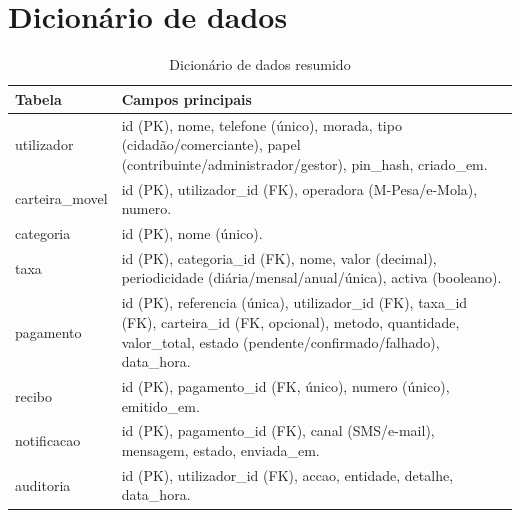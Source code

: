 \documentclass[12pt,a4paper,openany]{report}
\begin{document}
\chapter{Dicionário de dados}
\begin{table}[!htbp]
\caption{Dicionário de dados resumido}\label{tab:dd}
\begingroup\singlespacing\small
\begin{tabularx}{\textwidth}{@{}>{\ttfamily}p{3cm}X@{}}
\toprule
\textrm{Tabela} & Campos principais \\
\midrule
utilizador & id (PK), nome, telefone (único), morada, tipo (cidadão/comerciante), papel (contribuinte/administrador/gestor), pin\_hash, criado\_em. \\
carteira\_movel & id (PK), utilizador\_id (FK), operadora (M-Pesa/e-Mola), numero. \\
categoria & id (PK), nome (único). \\
taxa & id (PK), categoria\_id (FK), nome, valor (decimal), periodicidade (diária/mensal/anual/única), activa (booleano). \\
pagamento & id (PK), referencia (única), utilizador\_id (FK), taxa\_id (FK), carteira\_id (FK, opcional), metodo, quantidade, valor\_total, estado (pendente/confirmado/falhado), data\_hora. \\
recibo & id (PK), pagamento\_id (FK, único), numero (único), emitido\_em. \\
notificacao & id (PK), pagamento\_id (FK), canal (SMS/e-mail), mensagem, estado, enviada\_em. \\
auditoria & id (PK), utilizador\_id (FK), accao, entidade, detalhe, data\_hora. \\
\bottomrule
\end{tabularx}
\endgroup
\end{table}
\end{document}

